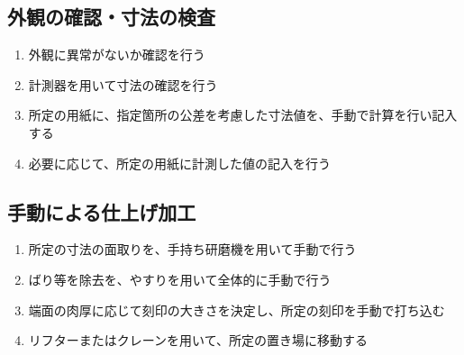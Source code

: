 \subsection{外観の確認・寸法の検査}
\begin{enumerate}
\item 外観に異常がないか確認を行う
\item 計測器を用いて寸法の確認を行う
\item 所定の用紙に、指定箇所の公差を考慮した寸法値を、手動で計算を行い記入する
\item 必要に応じて、所定の用紙に計測した値の記入を行う
\end{enumerate}


\subsection{手動による仕上げ加工}
\begin{enumerate}
\item 所定の寸法の面取りを、手持ち研磨機を用いて手動で行う
\item ばり等を除去を、やすりを用いて全体的に手動で行う
\item 端面の肉厚に応じて刻印の大きさを決定し、所定の刻印を手動で打ち込む
\item リフターまたはクレーンを用いて、所定の置き場に移動する
\end{enumerate}

